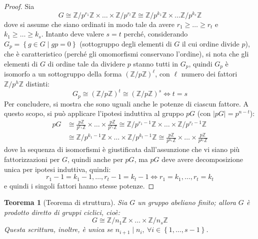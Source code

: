 \documentclass[11pt]{article}
\theoremstyle{style}
\newtheorem{teorema}{Teorema}[section]
\numberwithin{equation}{subsection}
\begin{document}
\begin{proof}
Sia 
\[
G \cong \mathbb{Z}/ p^{r_1} \mathbb{Z} \times \ldots \times \mathbb{Z}/ p^{r_t} \mathbb{Z} \cong \mathbb{Z}/ p^{k_1} \mathbb{Z}\times \ldots\mathbb{Z}/p^{k_s} \mathbb{Z}
\] 
dove si assume che siano ordinati in modo tale da avere $r_1\ge \ldots\ge r_t $ e $k_1\ge \ldots\ge k_s$.
Intanto deve valere $s=t$ perch\'e, considerando $G_p = \left\{ g \in G  \mid gp = 0 \right\} $ (sottogruppo degli elementi di $G$ il cui ordine divide $p$), che \`e caratteristico (perch\'e gli omomorfismi conservano l'ordine), si nota che gli elementi di $G$ di ordine tale da dividere $p$ stanno tutti in $G_p$, quindi $G_p$ \`e isomorfo a un sottogruppo della forma $(\mathbb{Z} / p\mathbb{Z})^\ell $, con $\ell $ numero dei fattori $\mathbb{Z} / p^h \mathbb{Z}$ distinti:
\[
G_p \cong (\mathbb{Z}/p\mathbb{Z})^t \cong (\mathbb{Z}/p\mathbb{Z})^s \iff t= s
\] 
Per concludere, si mostra che sono uguali anche le potenze di ciascun fattore.
A questo scopo, si pu\`o applicare l'ipotesi induttiva al gruppo $pG$ (con $\lvert pG \rvert =p^{n-t} $):
\[
	\begin{split}
		pG &\cong \frac{p\mathbb{Z}}{p^{r_1} \mathbb{Z}} \times \ldots\times \frac{p\mathbb{Z}}{p^{r_t} \mathbb{Z}}\cong \mathbb{Z}/p^{r_1-1} \mathbb{Z} \times  \ldots \times \mathbb{Z}/p^{r_t - 1} \mathbb{Z}\\
		   &\cong \mathbb{Z}/p^{k_1-1} \mathbb{Z}\times \ldots\times \mathbb{Z}/p^{k_t-1} \mathbb{Z}\cong \frac{p\mathbb{Z}}{p^{k_1} \mathbb{Z}}\times \ldots \times \frac{p\mathbb{Z}}{p^{k_t} \mathbb{Z}}
	\end{split}
\] 
dove la sequenza di isomorfismi \`e giustificata dall'assunzione che vi siano pi\`u fattorizzazioni per $G$, quindi anche per $pG$, ma $pG$ deve avere decomposizione unica per ipotesi induttiva, quindi:
\[
r_1-1=k_1-1, \ldots, r_t - 1 = k_t - 1 \iff r_1=k_1,\ldots,r_t = k_t
\] 
e quindi i singoli fattori hanno stesse potenze.
	\end{proof}
\begin{teorema}
	[Teorema di struttura]
	Sia $G$ un gruppo abeliano finito; allora $G$ \`e prodotto diretto di gruppi ciclici, cio\`e:
	\[
	G \cong \mathbb{Z}/n_1\mathbb{Z} \times  \ldots \times \mathbb{Z} / n_s \mathbb{Z}
	\] 
	Questa scrittura, inoltre, \`e unica se $n_{i+1}  \mid n_i, \ \forall i \in \left\{ 1, \ldots, s-1 \right\} $.
\end{teorema}
\end{document}
